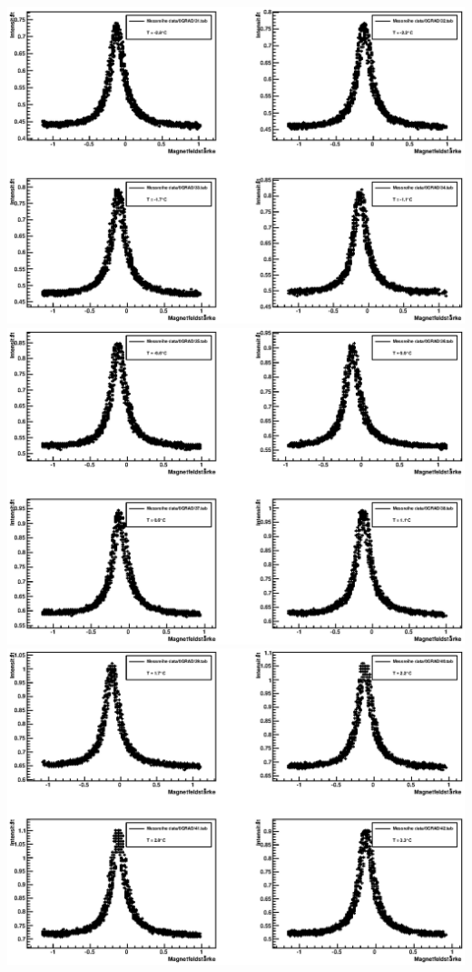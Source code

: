 \documentclass[12pt]{article}
\begin{document}
\includegraphics[width=1\linewidth]{pictures/13.eps} \\
\includegraphics[width=1\linewidth]{pictures/14.eps} \\
\includegraphics[width=1\linewidth]{pictures/15.eps} \\
\end{document}
